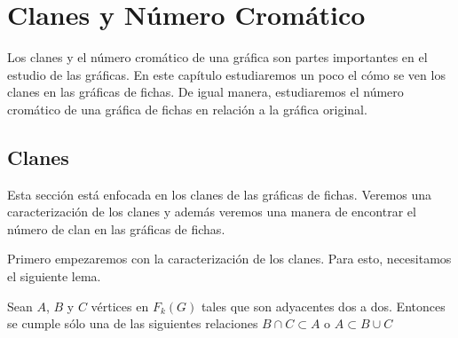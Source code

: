 \chapter{Clanes y N\'umero Crom\'atico}%
\label{cap:Clique-ChromNum}
Los clanes y el n\'umero crom\'atico de una gr\'afica son partes importantes en
el estudio de las gr\'aficas. En este cap\'itulo estudiaremos un poco el c\'omo
se ven los clanes en las gr\'aficas de fichas. De igual manera, estudiaremos el
n\'umero crom\'atico de una gr\'afica de fichas en relaci\'on a la gr\'afica
original.

\section{Clanes}%
\label{sec:clanes}

Esta secci\'on est\'a enfocada en los clanes de las gr\'aficas de fichas.
Veremos una caracterizaci\'on de los clanes y adem\'as veremos una manera de
encontrar el n\'umero de clan en las gr\'aficas de fichas.

Primero empezaremos con la caracterizaci\'on de los clanes. Para esto,
necesitamos el siguiente lema. 

\begin{lema}%
        \label{lem:K3}
        Sean $A$, $B$ y $C$ v\'ertices en $F_k(G)$ tales que son adyacentes dos
        a dos. Entonces se cumple s\'olo una de las siguientes relaciones $B
        \cap C \subset A$ o $A \subset B \cup C$
        \end{lema}


